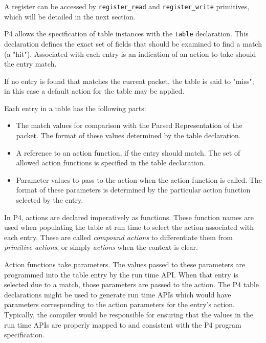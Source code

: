 \documentclass[12pt]{article}
\begin{document}
A register can be accessed by \texttt{register_read} and 
\texttt{register_write} primitives, which will be detailed in the 
next section.


P4 allows the specification of table instances with the \texttt{table}
declaration. This declaration defines the exact set of fields that
should be examined to find a match (a "hit").  Associated with each
entry is an indication of an action to take should the entry match.

If no entry is found that matches the current packet, the table is said to 
"miss"; in this case a default action for the table may be applied.

Each entry in a \matchaction table has the following parts: 

\begin{itemize}
\item
The match values for comparison with the Parsed Representation of the packet. 
The format of these values determined by the table declaration.
\item
A reference to an action function, if the entry should match. The set
of allowed action functions is specified in the table declaration.
\item
Parameter values to pass to the action when the action function is called. 
The format of these parameters is determined by the particular action function 
selected by the entry.
\end{itemize}


In P4, actions are declared imperatively as functions. These function
names are used when populating the table at run time to select the
action associated with each entry. These are called \textit{compound
actions} to differentiate them from \textit{primitive actions}, or
simply \textit{actions} when the context is clear.

Action functions take parameters. The values passed to these
parameters are programmed into the table entry by the run time
API. When that entry is selected due to a match, those parameters are
passed to the action. The P4 table declarations might be used to
generate run time APIs which would have parameters corresponding to
the action parameters for the entry's action.  Typically, the compiler
would be responsible for ensuring that the values in the run time APIs
are properly mapped to and consistent with the P4 program
specification.
\end{document}
